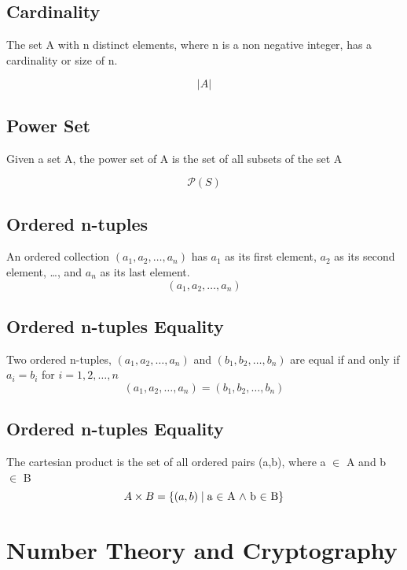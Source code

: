 \documentclass[12pt]{article}
\begin{document}
\subsection{Cardinality}
The set A with n distinct elements, where n is a non negative integer,
has a cardinality or size of n.

\begin{equation}
\left| {A} \right|
\end{equation}

\subsection{Power Set}
Given a set A, the power set of A is the set of all subsets of the set A 

\begin{equation}
\mathcal P \left({S}\right)
\end{equation}

\subsection{Ordered n-tuples}
An ordered collection $(a_1, a_2, \ldots, a_n)$ has $a_1$ as its first element, $a_2$ as its second element, \ldots, and $a_n$ as its last element.
\begin{equation}
(a_1, a_2, \ldots, a_n)
\end{equation}

\subsection{Ordered n-tuples Equality}
Two ordered n-tuples, $(a_1, a_2, \ldots, a_n)$ and $(b_1, b_2, \ldots, b_n)$ are equal
if and only if $a_i = b_i$ for $i = 1,2,\ldots,n$
\begin{equation}
(a_1, a_2, \ldots, a_n) = (b_1, b_2, \ldots, b_n)
\end{equation}

\subsection{Ordered n-tuples Equality}
The cartesian product is the set of all ordered pairs (a,b), where a $\in$ A and b $\in$ B
\begin{equation}
A \times B = \{(a,b)\mid\text{a $\in$ A $\wedge$ b $\in$ B}\}
$$
$$\end{equation}

%
%
%
%
%
%
\pagebreak
\section{Number Theory and Cryptography}
\setcounter{equation}{0}
\end{document}

